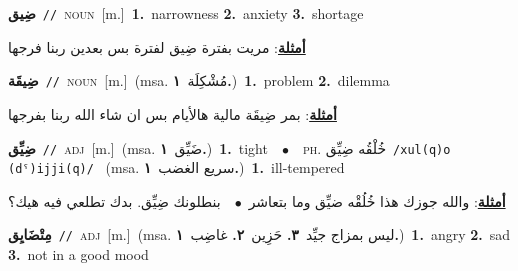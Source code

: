 \documentclass[10pt,a4paper,twoside]{article} %
\begin{document}
\begin{multicols}{2}
{\setlength\topsep{0pt}\textbf{\foreignlanguage{arabic}{ضِيق}}\ {\color{gray}\texttt{//}\color{black}}\ \textsc{noun}\ [m.]\ \textbf{1.}~narrowness  \textbf{2.}~anxiety  \textbf{3.}~shortage\  \begin{flushright}\color{gray}\foreignlanguage{arabic}{\textbf{\underline{\foreignlanguage{arabic}{أمثلة}}}: مريت بفترة ضِيق لفترة بس بعدين ربنا فرجها}\end{flushright}\color{black}} \vspace{2mm}

{\setlength\topsep{0pt}\textbf{\foreignlanguage{arabic}{ضِيقَة}}\ {\color{gray}\texttt{//}\color{black}}\ \textsc{noun}\ [m.]\ \color{gray}(msa. \foreignlanguage{arabic}{مُشْكِلَة}~\foreignlanguage{arabic}{\textbf{١.}})\color{black}\ \textbf{1.}~problem  \textbf{2.}~dilemma\  \begin{flushright}\color{gray}\foreignlanguage{arabic}{\textbf{\underline{\foreignlanguage{arabic}{أمثلة}}}: بمر ضِيقَة مالية هالأيام بس ان شاء الله ربنا بفرجها}\end{flushright}\color{black}} \vspace{2mm}

{\setlength\topsep{0pt}\textbf{\foreignlanguage{arabic}{ضِيِّق}}\ {\color{gray}\texttt{//}\color{black}}\ \textsc{adj}\ [m.]\ \color{gray}(msa. \foreignlanguage{arabic}{ضَيِّق}~\foreignlanguage{arabic}{\textbf{١.}})\color{black}\ \textbf{1.}~tight\ \ $\bullet$\ \ \textsc{ph.} \color{gray} \foreignlanguage{arabic}{خُلْقُه ضِيِّق}\color{black}\ {\color{gray}\texttt{/{\sffamily xul(q)o (dˤ)ijji(q)}/}\color{black}}\ \color{gray} (msa. \foreignlanguage{arabic}{سريع الغضب}~\foreignlanguage{arabic}{\textbf{١.}})\color{black}\ \textbf{1.}~ill-tempered\  \begin{flushright}\color{gray}\foreignlanguage{arabic}{\textbf{\underline{\foreignlanguage{arabic}{أمثلة}}}: والله جوزك هذا خُلُقْه ضيِّق وما بتعاشر\ $\bullet$\ \  بنطلونك ضِيِّق. بدك تطلعي فيه هيك؟}\end{flushright}\color{black}} \vspace{2mm}

{\setlength\topsep{0pt}\textbf{\foreignlanguage{arabic}{مِتْضَايِق}}\ {\color{gray}\texttt{//}\color{black}}\ \textsc{adj}\ [m.]\ \color{gray}(msa. \foreignlanguage{arabic}{ليس بمزاج جيِّد}~\foreignlanguage{arabic}{\textbf{٣.}}  \foreignlanguage{arabic}{حَزِين}~\foreignlanguage{arabic}{\textbf{٢.}}  \foreignlanguage{arabic}{غاضِب}~\foreignlanguage{arabic}{\textbf{١.}})\color{black}\ \textbf{1.}~angry  \textbf{2.}~sad  \textbf{3.}~not in a good mood\ } \vspace{2mm}


\end{multicols}
\end{document}
